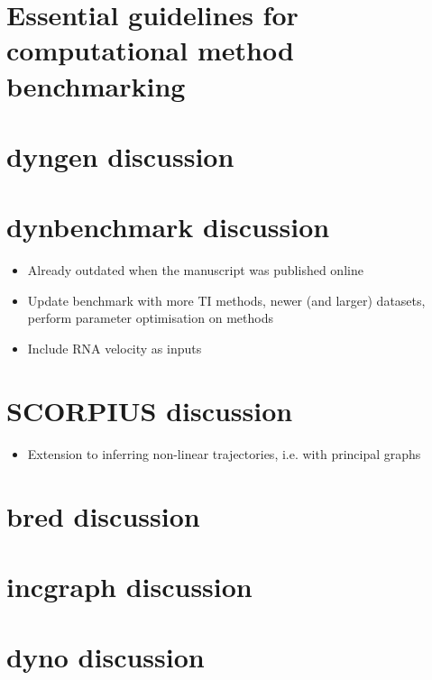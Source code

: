 \section{Essential guidelines for computational method benchmarking}


%

%

\section{dyngen discussion}

\section{dynbenchmark discussion}
\begin{itemize}
	\item Already outdated when the manuscript was published online
	\item Update benchmark with more TI methods, newer (and larger) datasets, perform parameter optimisation on methods
	\item Include RNA velocity as inputs
\end{itemize}

\section{SCORPIUS discussion}
\begin{itemize}
	\item Extension to inferring non-linear trajectories, i.e. with principal graphs
\end{itemize}

\section{bred discussion}

\section{incgraph discussion}

\section{dyno discussion}
